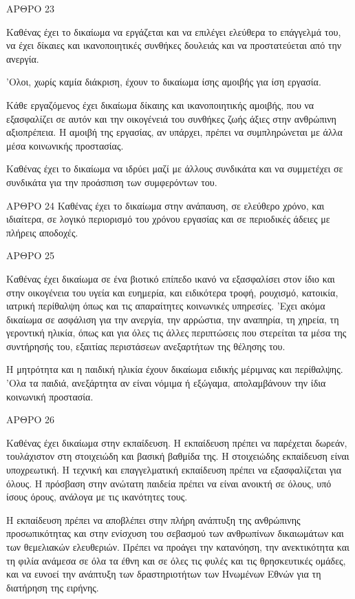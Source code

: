 \documentclass{report}
\begin{document}
      ΑΡΘΡΟ 23


            Καθένας έχει το δικαίωμα να εργάζεται και να επιλέγει ελεύθερα το επάγγελμά του, να έχει δίκαιες και ικανοποιητικές συνθήκες δουλειάς και να προστατεύεται από την ανεργία.


            'Ολοι, χωρίς καμία διάκριση, έχουν το δικαίωμα ίσης αμοιβής για ίση εργασία.


            Κάθε εργαζόμενος έχει δικαίωμα δίκαιης και ικανοποιητικής αμοιβής, που να εξασφαλίζει σε αυτόν και την οικογένειά του συνθήκες ζωής άξιες στην ανθρώπινη αξιοπρέπεια. Η αμοιβή της εργασίας, αν υπάρχει, πρέπει να συμπληρώνεται με άλλα μέσα κοινωνικής προστασίας.


            Καθένας έχει το δικαίωμα να ιδρύει μαζί με άλλους συνδικάτα και να συμμετέχει σε συνδικάτα για την προάσπιση των συμφερόντων του.



      ΑΡΘΡΟ 24
      Καθένας έχει το δικαίωμα στην ανάπαυση, σε ελεύθερο χρόνο, και ιδιαίτερα, σε λογικό περιορισμό του χρόνου εργασίας και σε περιοδικές άδειες με πλήρεις αποδοχές.

      ΑΡΘΡΟ 25


            Καθένας έχει δικαίωμα σε ένα βιοτικό επίπεδο ικανό να εξασφαλίσει στον ίδιο και στην οικογένεια του υγεία και ευημερία, και ειδικότερα τροφή, ρουχισμό, κατοικία, ιατρική περίθαλψη όπως και τις απαραίτητες κοινωνικές υπηρεσίες. 'Εχει ακόμα δικαίωμα σε ασφάλιση για την ανεργία, την αρρώστια, την αναπηρία, τη χηρεία, τη γεροντική ηλικία, όπως και για όλες τις άλλες περιπτώσεις που στερείται τα μέσα της συντήρησής του, εξαιτίας περιστάσεων ανεξαρτήτων της θέλησης του.


            Η μητρότητα και η παιδική ηλικία έχουν δικαίωμα ειδικής μέριμνας και περίθαλψης. 'Ολα τα παιδιά, ανεξάρτητα αν είναι νόμιμα ή εξώγαμα, απολαμβάνουν την ίδια κοινωνική προστασία.



      ΑΡΘΡΟ 26


            Καθένας έχει δικαίωμα στην εκπαίδευση. Η εκπαίδευση πρέπει να παρέχεται δωρεάν, τουλάχιστον στη στοιχειώδη και βασική βαθμίδα της. Η στοιχειώδης εκπαίδευση είναι υποχρεωτική. Η τεχνική και επαγγελματική εκπαίδευση πρέπει να εξασφαλίζεται για όλους. Η πρόσβαση στην ανώτατη παιδεία πρέπει να είναι ανοικτή σε όλους, υπό ίσους όρους, ανάλογα με τις ικανότητες τους.


            Η εκπαίδευση πρέπει να αποβλέπει στην πλήρη ανάπτυξη της ανθρώπινης προσωπικότητας και στην ενίσχυση του σεβασμού των ανθρωπίνων δικαιωμάτων και των θεμελιακών ελευθεριών. Πρέπει να προάγει την κατανόηση, την ανεκτικότητα και τη φιλία ανάμεσα σε όλα τα έθνη και σε όλες τις φυλές και τις θρησκευτικές ομάδες, και να ευνοεί την ανάπτυξη των δραστηριοτήτων των Ηνωμένων Εθνών για τη διατήρηση της ειρήνης.
\end{document}
